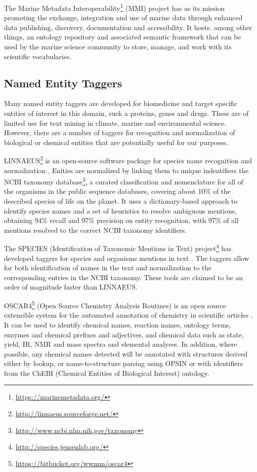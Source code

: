 The Marine Metadata Interoperability\footnote{\url{https://marinemetadata.org/}} (MMI) project has as its mission promoting the exchange, integration and use of marine data through enhanced data publishing, discovery, documentation and accessibility.
It hosts. among other things, an ontology repository and associated semantic framework that can be used by the marine science community to store, manage, and work with its scientific vocabularies.


\subsection{Named Entity Taggers}

Many named entity taggers are developed for biomedicine and target specific entities of interest in this domain, such a proteins, genes and drugs.
These are of limited use for text mining in climate, marine and environmental science. 
However, there are a number of taggers for recognition and normalization of biological or chemical entities that are potentially useful for our purposes.

LINNAEUS\footnote{\url{http://linnaeus.sourceforge.net/}} is an open-source software package for species name recognition and normalization \citep{Gerner2010LINNAEUS}. 
Enities are normalized by linking them to unique indentifiers the NCBI taxonomy database\footnote{\url{http://www.ncbi.nlm.nih.gov/taxonomy}}, a curated classification and nomenclature for all of the organisms in the public sequence databases, covering about 10\% of the described species of life on the planet.
It uses a dictionary-based approach to identify species names and a set of heuristics to resolve ambiguous mentions, obtaining 94\% recall and 97\% precision on entity recognition, with 97\% of all mentions resolved to the correct NCBI taxonomy identifiers.
 
The SPECIES (Identification of Taxonomic Mentions in Text) project\footnote{\url{http://species.jensenlab.org/}} has developed taggers for species and organisms mentions in text \citep{Pafilis2013SPECIES}. 
The taggers allow for both identification of names in the text and normalization to the corresponding entries in the NCBI taxonomy.
These tools are claimed to be an order of magnitude faster than LINNAEUS.

OSCAR4\footnote{\url{https://bitbucket.org/wwmm/oscar4}} (Open Source Chemistry Analysis Routines) is an open source extensible system for the automated annotation of chemistry in scientific articles \citep{Jessop2011OSCAR4}.
It can be used to identify chemical names, reaction names, ontology terms, enzymes and chemical prefixes and adjectives, and chemical data such as state, yield, IR, NMR and mass spectra and elemental analyses. 
In addition, where possible, any chemical names detected will be annotated with structures derived either by lookup, or name-to-structure parsing using OPSIN or with identifiers from the ChEBI (Chemical Entities of Biological Interest) ontology.

